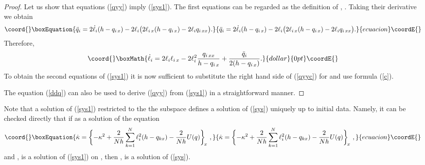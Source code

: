 \documentclass[a4paper,11pt]{article}
\theoremstyle{plain}
\theoremstyle{remark}
\begin{document}
\begin{proof}
Let us show that equations (\ref{qyy}) imply (\ref{sys1}).
The first equations can be regarded as the definition of \coordHE{},
\coordHE{}. Taking their derivative we obtain
\begin{equation}\coord{}\boxEquation{\label{ddq}
\ddot q_i=2\dot\ell_i(h-q_{i\,x})-2\ell_i
\bigl( 2\ell_{i\,x}(h-q_{i\,x})-2\ell_i q_{i\,xx}\bigr) .
}{\ddot q_i=2\dot\ell_i(h-q_{i\,x})-2\ell_i
\bigl( 2\ell_{i\,x}(h-q_{i\,x})-2\ell_i q_{i\,xx}\bigr) .
}{ecuacion}\coordE{}\end{equation}
Therefore,
$$\coord{}\boxMath{
\dot\ell_i=2\ell_i\ell_{i\,x}-2\ell_i^2 \frac{q_{i\,xx}}{h-q_{i\,x}}
+\frac{\ddot q_i}{2(h-q_{i\,x})} .
}{dollar}{0pt}\coordE{}$$
To obtain the second equations of (\ref{sys1}) it is now sufficient
to substitute the right hand side of (\ref{qyyc}) for \coordHE{}
and use formula (\ref{c}).

The equation (\ref{ddq}) can also be used to derive (\ref{qyy})
from (\ref{sys1}) in a straightforward manner.
\end{proof}

Note that a solution of (\ref{sys1}) restricted to the the subspace \coordHE{}
defines a solution of (\ref{sys}) uniquely up to initial data. Namely,
it can be checked directly that if \coordHE{} as a solution of the equation
\begin{equation}\coord{}\boxEquation{\label{kap}
\dot \kappa= \biggl\{-\kappa^2 +
\frac{2}{Nh}\sum_{k=1}^N \ell_i^2(h-q_{kx})-\frac{2}{Nh} U(q)
\biggr\}_{\!x}\ ,
}{\dot \kappa= \biggl\{-\kappa^2 +
\frac{2}{Nh}\sum_{k=1}^N \ell_i^2(h-q_{kx})-\frac{2}{Nh} U(q)
\biggr\}_{\!x}\ ,
}{ecuacion}\coordE{}\end{equation}
and \coordHE{}, \coordHE{} is a solution of (\ref{sys1}) on \coordHE{}, then
\coordHE{}, \coordHE{} is a solution of (\ref{sys}).
\end{document}
